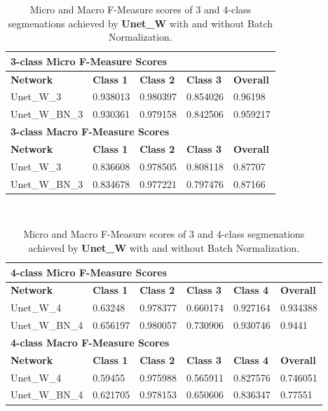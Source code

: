 \begin {table}
	\begin{flushleft}
		\begin {tabular}[!htb]{|l|l|l|l|l|}
			\hline\multicolumn{5}{|l|}{\textbf{3-class Micro F-Measure Scores}} \\ \hline
			\textbf{Network}& \textbf{Class 1}& \textbf{Class 2}& \textbf{Class 3}& \textbf{Overall} \\ \hline
			Unet\_W\_3& \cellcolor{green!25}0.938013& \cellcolor{green!25}0.980397& \cellcolor{green!25}0.854026& \cellcolor{green!25}0.96198 \\ \hline
			Unet\_W\_BN\_3& 0.930361&  0.979158& 0.842506& 0.959217\\ \hline
			\multicolumn{5}{|l|}{\textbf{3-class Macro F-Measure Scores}} \\ \hline
			\textbf{Network}& \textbf{Class 1}& \textbf{Class 2}& \textbf{Class 3}& \textbf{Overall} \\ \hline
			Unet\_W\_3& \cellcolor{green!25}0.836608& \cellcolor{green!25}0.978505& \cellcolor{green!25}0.808118& \cellcolor{green!25}0.87707 \\ \hline
			Unet\_W\_BN\_3& 0.834678& 0.977221& 0.797476& 0.87166\\ \hline
		\end {tabular}
		\vspace{0.5cm}\\
		\begin {tabular}[!htb]{|l|l|l|l|l|l|}
			\hline\multicolumn{6}{|l|}{\textbf{4-class Micro F-Measure Scores}} \\ \hline
			\textbf{Network}& \textbf{Class 1}& \textbf{Class 2}& \textbf{Class 3}& \textbf{Class 4}& \textbf{Overall} \\ \hline
			Unet\_W\_4& 0.63248& 0.978377& 0.660174& 0.927164& 0.934388 \\ \hline
			Unet\_W\_BN\_4& \cellcolor{green!25}0.656197& \cellcolor{green!25}0.980057& \cellcolor{green!25}0.730906& \cellcolor{green!25}0.930746& \cellcolor{green!25}0.9441\\ \hline
			\multicolumn{6}{|l|}{\textbf{4-class Macro F-Measure Scores}} \\ \hline
			\textbf{Network}& \textbf{Class 1}& \textbf{Class 2}& \textbf{Class 3}& \textbf{Class 4}& \textbf{Overall} \\ \hline
			Unet\_W\_4& 0.59455& 0.975988& 0.565911& 0.827576& 0.746051 \\ \hline
			Unet\_W\_BN\_4& \cellcolor{green!25}0.621705& \cellcolor{green!25}0.978153& \cellcolor{green!25}0.650606& \cellcolor{green!25}0.836347& \cellcolor{green!25}0.77551\\ \hline
		\end {tabular}
	\end {flushleft}

\caption[Micro and Macro F-Measure scores for a network with and without Batch Normalization.]{Micro and Macro F-Measure scores of 3 and 4-class segmenations achieved by \textbf{Unet\_W} with and without Batch Normalization.}
\label{tab:results2}
\end {table}


